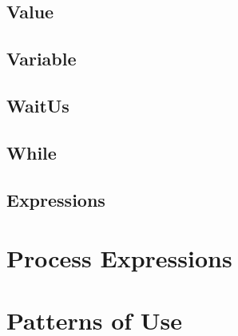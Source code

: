 \subsection{Value}
\subsection{Variable}
\subsection{WaitUs}
\subsection{While}
\subsection{Expressions}

\section{Process Expressions}

\section{Patterns of Use}
